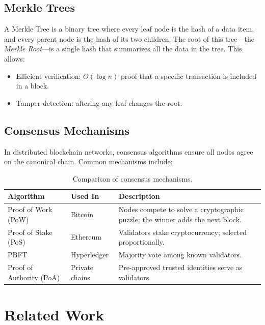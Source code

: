 \documentclass[12pt, a4paper]{report}
\begin{document}
\subsection{Merkle Trees}

A Merkle Tree is a binary tree where every leaf node is the hash of a data
item, and every parent node is the hash of its two children. The root of this
tree—the \textit{Merkle Root}—is a single hash that summarizes all the data in
the tree. This allows:

\begin{itemize}
    \item Efficient verification: $O(\log n)$ proof that a specific transaction
          is included in a block.
    \item Tamper detection: altering any leaf changes the root.
\end{itemize}

\subsection{Consensus Mechanisms}

In distributed blockchain networks, consensus algorithms ensure all nodes agree
on the canonical chain. Common mechanisms include:

\begin{table}[H]
\centering
\begin{tabularx}{\textwidth}{l l X}
\toprule
\textbf{Algorithm} & \textbf{Used In} & \textbf{Description} \\
\midrule
Proof of Work (PoW) & Bitcoin & Nodes compete to solve a cryptographic puzzle;
the winner adds the next block. \\
Proof of Stake (PoS) & Ethereum & Validators stake cryptocurrency; selected
proportionally. \\
PBFT & Hyperledger & Majority vote among known validators. \\
Proof of Authority (PoA) & Private chains & Pre-approved trusted identities
serve as validators. \\
\bottomrule
\end{tabularx}
\caption{Comparison of consensus mechanisms.}
\end{table}

\section{Related Work}
\end{document}
